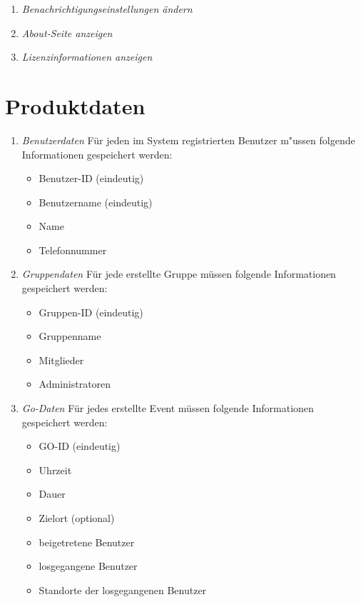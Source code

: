 \documentclass[parskip=full]{scrartcl}
\def\threedigits#1{%
  \ifnum#1<100 0\fi
  \ifnum#1<10 0\fi
  \number#1}
\begin{document}
\begin{enumerate}[label={\textbf{/F\protect\threedigits{\theenumi}0/}}, leftmargin=*, resume]	
	\item \textit{Benachrichtigungseinstellungen ändern}
	\item \textit{About-Seite anzeigen}
	\item \textit{Lizenzinformationen anzeigen}
\end{enumerate}

\section{Produktdaten}

\begin{enumerate}[label={\textbf{/D\protect\threedigits{\theenumi}0/}}, leftmargin=*]
	\item \textit{Benutzerdaten} Für jeden im System registrierten Benutzer m"ussen folgende Informationen gespeichert werden:
	\begin{itemize}
		\item Benutzer-ID (eindeutig)
		\item Benutzername (eindeutig)
		\item Name
		\item Telefonnummer
	\end{itemize}
	\item \textit{Gruppendaten} Für jede erstellte Gruppe müssen folgende Informationen gespeichert werden:
	\begin{itemize}
	\item Gruppen-ID (eindeutig)
		\item Gruppenname
		\item Mitglieder
		\item Administratoren
	\end{itemize}
	\item \textit{Go-Daten} Für jedes erstellte Event müssen folgende Informationen gespeichert werden:
	\begin{itemize}
		\item GO-ID (eindeutig)
		\item Uhrzeit
		\item Dauer
		\item Zielort (optional)
		\item beigetretene Benutzer
		\item losgegangene Benutzer
		\item Standorte der losgegangenen Benutzer
	\end{itemize}
\end{enumerate}
\end{document}
